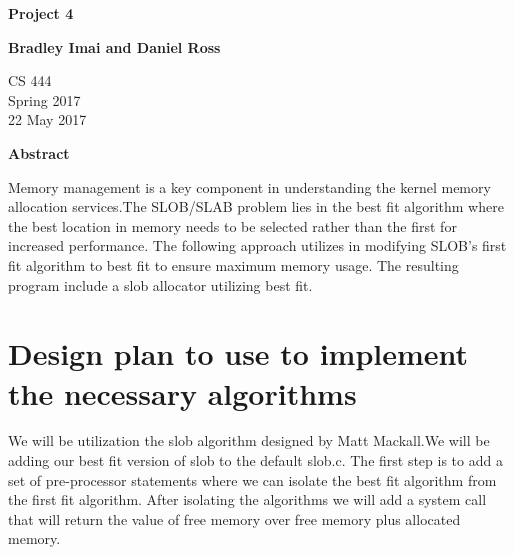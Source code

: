 \documentclass[letterpaper,10pt,titlepage]{article}
\begin{document}
\begin{titlepage}
    \begin{center}
        \vspace*{3.5cm}

        \textbf{Project 4}

        \vspace{0.5cm}

        \textbf{Bradley Imai and Daniel Ross}

        \vspace{0.8cm}

        CS 444\\
        Spring 2017\\
        22 May 2017\\

        \vspace{1cm}

        \textbf{Abstract}\\

        \vspace{0.5cm}

                Memory management is a key component in understanding the kernel memory allocation services.The SLOB/SLAB problem lies in the best fit algorithm where the best location in memory needs to be selected rather than the first for increased performance. The following approach utilizes in modifying SLOB's first fit algorithm to best fit to ensure maximum memory usage. The resulting program include a slob allocator utilizing best fit.
 \vfill


    \end{center}
\end{titlepage}

\newpage

\section{Design plan to use to implement the necessary algorithms}

We will be utilization the slob algorithm designed by Matt Mackall.We will be adding our best fit version of slob to the default slob.c. The first step is to add a set of pre-processor statements where we can isolate the best fit algorithm from the first fit algorithm. After isolating the algorithms we will add a system call that will return the value of free memory over free memory plus allocated memory.
\end{document}
